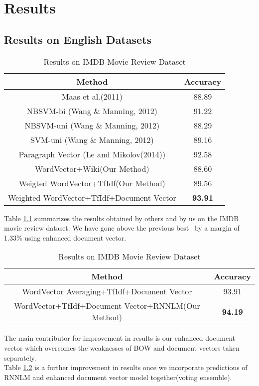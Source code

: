 \chapter{Results}
\label{sec:result}
\section{Results on English Datasets}

\begin {table}[H]
\centering
\begin{tabular}{ | c | c | }
\hline
\textbf{Method} & \textbf{Accuracy} \\ \hline
Maas et al.(2011) & 88.89\\ \hline
NBSVM-bi (Wang \& Manning, 2012) & 91.22\\ \hline
NBSVM-uni (Wang \& Manning, 2012) & 88.29\\ \hline
SVM-uni (Wang \& Manning, 2012) & 89.16\\ \hline
Paragraph Vector (Le and Mikolov(2014)) & 92.58\\ \hline
WordVector+Wiki(Our Method) & 88.60\\ \hline
Weigted WordVector+TfIdf(Our Method) & 89.56\\ \hline
Weighted WordVector+TfIdf+Document Vector & \textbf{93.91}\\ \hline

\end{tabular}
\caption {Results on IMDB Movie Review Dataset}
\label{table:IMDB}
\end{table}

Table \ref{table:IMDB} summarizes the results obtained by others and by us on the IMDB movie review dataset. We have gone above the previous best~\cite{Le:14} by a margin of 1.33\% using enhanced document vector.

\begin {table}[H]
\centering
\begin{tabular}{ | c | c | }
\hline
\textbf{Method} & \textbf{Accuracy} \\ \hline
WordVector Averaging+TfIdf+Document Vector & 93.91\\ \hline
WordVector+TfIdf+Document Vector+RNNLM(Our Method) & \textbf{94.19}\\ \hline
\end{tabular}
\caption {Results on IMDB Movie Review Dataset}
\label{table:IMDB_rnnlm}
\end{table}

The main contributor for improvement in results is our enhanced document vector which overcomes the weaknesses of BOW and document vectors taken separately.\\
Table \ref{table:IMDB_rnnlm} is a further improvement in results once we incorporate predictions of RNNLM and enhanced document vector model together(voting ensemble).

